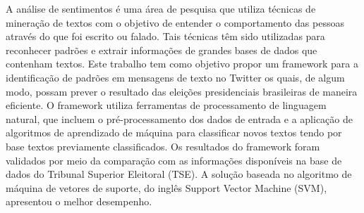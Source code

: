 A análise de sentimentos é uma área de pesquisa que utiliza técnicas de mineração de textos com o objetivo de entender o comportamento das pessoas através do que foi escrito ou falado. Tais técnicas têm sido utilizadas para reconhecer padrões e
extrair informações de grandes bases de dados que contenham textos. Este trabalho tem como objetivo propor um framework para a identificação de padrões em mensagens de texto no Twitter os quais, de algum modo, possam prever o resultado das eleições presidenciais brasileiras de maneira eficiente.  O framework utiliza ferramentas de processamento de linguagem natural, que incluem o pré-processamento dos dados de entrada e a aplicação de algoritmos de aprendizado de máquina para classificar novos textos tendo por base textos previamente classificados. Os resultados do framework foram validados por meio da comparação com as informações disponíveis na base de dados do Tribunal Superior Eleitoral (TSE). A solução baseada no algoritmo de máquina de vetores de suporte, do inglês Support Vector Machine (SVM), apresentou o melhor desempenho.
